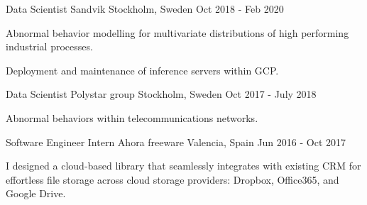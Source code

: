 \begin{cventries}
\cventry
    {Data Scientist}
    {Sandvik}
    {Stockholm, Sweden}
    {Oct 2018 - Feb 2020}
    {
        \begin{cvitems}
            \item {Abnormal behavior modelling for multivariate distributions of high performing industrial processes.}
            \item {Deployment and maintenance of inference servers within GCP.}
        \end{cvitems}
    }
    
\cventry
    {Data Scientist}
    {Polystar group}
    {Stockholm, Sweden}
    {Oct 2017 - July 2018}
    {
        \begin{cvitems}
            \item {Abnormal behaviors within telecommunications networks.}
        \end{cvitems}
    }
    
\cventry
    {Software Engineer Intern}
    {Ahora freeware}
    {Valencia, Spain}
    {Jun 2016 - Oct 2017}
    {
        \begin{cvitems}
            \item {I designed a cloud-based library that seamlessly integrates with existing CRM for effortless file storage across cloud storage providers: Dropbox, Office365, and Google Drive.}
        \end{cvitems}
    }


\end{cventries}
